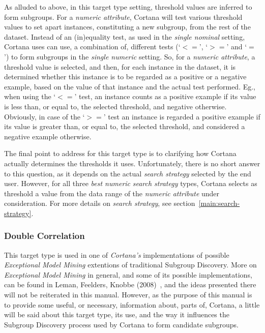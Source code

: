 \documentclass{article}
\begin{document}
As alluded to above, in this target type setting, threshold values are inferred to form subgroups.
For a \emph{numeric attribute}, Cortana will test various threshold values to set apart instances, constituting a new subgroup, from the rest of the dataset.
Instead of an (in)equality test, as used in the \emph{single nominal} setting, Cortana uses can use, a combination of, different tests (`$<=$', `$>=$' and `$=$') to form subgroups in the \emph{single numeric} setting.
So, for a \emph{numeric attribute}, a threshold value is selected, and then, for each instance in the dataset, it is determined whether this instance is to be regarded as a positive or a negative example, based on the value of that instance and the actual test performed.
Eg., when using the `$<=$' test, an instance counts as a positive example if its value is less than, or equal to, the selected threshold, and negative otherwise.
Obviously, in case of the `$>=$' test an instance is regarded a positive example if its value is greater than, or equal to, the selected threshold, and considered a negative example otherwise.

The final point to address for this target type is to clarifying how Cortana actually determines the thresholds it uses.
Unfortunately, there is no short answer to this question, as it depends on the actual \emph{search strategy} selected by the end user.
However, for all three \emph{best numeric} \emph{search strategy} types, Cortana selects as threshold a value from the data range of the \emph{numeric attribute} under consideration.
For more details on \emph{search strategy}, see section~\ref{main:search-strategy}.

\subsubsection{Double Correlation}
This target type is used in one of \emph{Cortana's} implementations of possible \emph{Exceptional Model Mining} extentions of traditional Subgroup Discovery.
More on \emph{Exceptional Model Mining} in general, and some of its possible implementations, can be found in Leman, Feelders, Knobbe (2008)~\cite{emm}, and the ideas presented there will not be reiterated in this manual.
However, as the purpose of this manual is to provide some useful, or necessary, information about, parts of,  Cortana, a little will be said about this target type, its use, and the way it influences the Subgroup Discovery process used by Cortana to form candidate subgroups.
\end{document}
